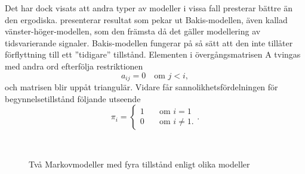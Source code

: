 \documentclass[../rapport_MVEX01-11-05]{subfiles}
\begin{document}
Det har dock visats att andra typer av modeller i vissa fall presterar
bättre än den ergodiska. 
presenterar resultat som pekar ut Bakis-modellen, även kallad
vänster-höger-modellen, som den främsta då det gäller modellering
av tidsvarierande signaler. Bakis-modellen fungerar på så sätt att den
inte tillåter förflyttning till ett ''tidigare'' tillstånd. Elementen i
övergångsmatrisen A tvingas med andra ord efterfölja restriktionen
\begin{equation*}
a_{ij} = 0 \quad\text{om }j<i,
\end{equation*}
och matrisen blir uppåt triangulär.
Vidare får sannolikhetsfördelningen för begynnelsetillstånd följande
utseende
\begin{equation*}
\pi_i = \begin{cases}
         1 & \quad\text{om } i = 1\\
         0 & \quad\text{om } i \neq 1.\end{cases}.
\end{equation*}  

\begin{figure}[tb]
  \centering
	\\[2em]
  \caption{Två Markovmodeller med fyra tillstånd enligt olika modeller}
  \label{fig:hmm-lr-lrb}
\end{figure}
\end{document}

